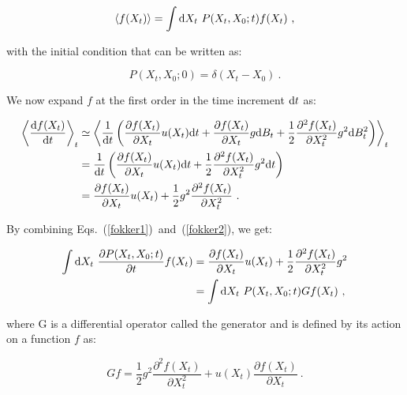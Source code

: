 \begin{equation}
	\langle f(X_t) \rangle = \int \textnormal{d}X_t ~ P(X_t, X_0 ; t) f(X_t) ~,
	\label{fokker1}
\end{equation}

with the initial condition that can be written as:

\begin{equation}
P(X_t, X_0; 0) = \delta (X_t - X_0) ~.
\end{equation}

We now expand $f$ at the first order in the time increment $\textnormal{d}t$ as:

\begin{equation}
	\begin{aligned}
		\left\langle \frac{\textnormal{d}f(X_t)}{\textnormal{d}t} \right\rangle_t  &\simeq \left\langle \frac{1}{\textnormal{d}t} \left( \frac{\partial f(X_t)}{\partial X_t} u(X_t) \textnormal{d}t + \frac{\partial f(X_t)}{\partial X_t} g \textnormal{d}B_t + \frac{1}{2} \frac{\partial^2 f(X_t)}{\partial X_t^2} g^2  \textnormal{d}B_t^2   \right) \right\rangle_t \\
		& =  \frac{1}{\textnormal{d}t} \left( \frac{\partial f(X_t)}{\partial X_t} u(X_t) \textnormal{d}t + \frac{1}{2} \frac{\partial^2 f(X_t)}{\partial X_t^2} g^2 \textnormal{d}t \right) \\
		& = \frac{\partial f(X_t)}{\partial X_t} u(X_t) + \frac{1}{2} g^2 \frac{\partial^2 f(X_t)}{\partial X_t^2}   ~.
	\end{aligned}
	\label{fokker2}
\end{equation}

By combining Eqs.~(\ref{fokker1})~and~(\ref{fokker2}), we get:

\begin{equation}
	\begin{aligned}
		\int \textnormal{d} X_t ~\frac{\partial P(X_t, X_0 ; t) }{\partial t} f(X_t)
		& =  \frac{\partial f(X_t)}{\partial X_t} u(X_t) + \frac{1}{2} \frac{\partial^2 f(X_t)}{\partial X_t^2} g^2 \\
		& = \int \textnormal{d}X_t ~ P(X_t, X_0 ; t) G f(X_t) ~,
	\end{aligned}
\end{equation}

where G is a differential operator called the generator and is defined by its action on a function $f$ as:

\begin{equation}
	Gf = \frac{1}{2} g^2 \frac{\partial ^2 f(X_t)}{\partial X_t^2} + u(X_t) \frac{\partial f(X_t)}{\partial X_t} ~.
\end{equation}

